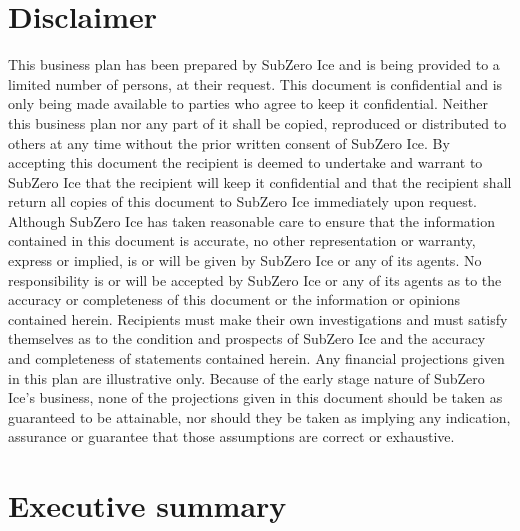 \documentclass{article}
\begin{document}
\begin{titlepage}
\end{titlepage}

\pagebreak

\tableofcontents

\pagebreak



\section{Disclaimer}
This business plan has been prepared by SubZero Ice and is being provided to a limited number of persons, at their request.  This document is confidential and is only being made available to parties who agree to keep it confidential.  Neither this business plan nor any part of it shall be copied, reproduced or distributed to others at any time without the prior written consent of SubZero Ice. By accepting this document the recipient is deemed to undertake and warrant to SubZero Ice that the recipient will keep it confidential and that the recipient shall return all copies of this document to SubZero Ice immediately upon request.
Although SubZero Ice has taken reasonable care to ensure that the information contained in this document is accurate, no other representation or warranty, express or implied, is or will be given by SubZero Ice or any of its agents.  No responsibility is or will be accepted by SubZero Ice or any of its agents as to the accuracy or completeness of this document or the information or opinions contained herein.  Recipients must make their own investigations and must satisfy themselves as to the condition and prospects of SubZero Ice and the accuracy and completeness of statements contained herein.
Any financial projections given in this plan are illustrative only.  Because of the early stage nature of SubZero Ice’s business, none of the projections given in this document should be taken as guaranteed to be attainable, nor should they be taken as implying any indication, assurance or guarantee that those assumptions are correct or exhaustive.

\pagebreak

\tableofcontents

\pagebreak


\section{Executive summary}
\end{document}
